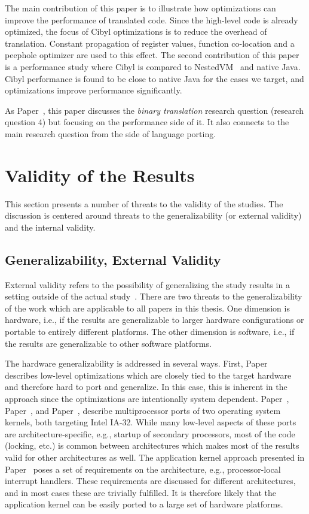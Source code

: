 The main contribution of this paper is to illustrate how optimizations can
improve the performance of translated code. Since the high-level code is
already optimized, the focus of Cibyl optimizations is to reduce the overhead
of translation. Constant propagation of register values, function co-location
and a peephole optimizer are used to this effect. The second contribution of
this paper is a performance study where Cibyl is compared to
NestedVM~\cite{alliet04nestedvm} and native Java. Cibyl performance is found
to be close to native Java for the cases we target, and optimizations improve
performance significantly.

As Paper~, this paper discusses the \emph{binary translation}
research question (research question 4) but focusing on the performance side
of it. It also connects to the main research question from the side of
language porting.

\section{Validity of the Results}
\label{sec:intro:validity}
This section presents a number of threats to the validity of the studies. The
discussion is centered around threats to the generalizability (or external
validity) and the internal validity.

\subsection{Generalizability, External Validity}
External validity refers to the possibility of generalizing the study results
in a setting outside of the actual study~\cite[page 106]{robson02realworld}.
There are two threats to the generalizability of the work which are
applicable to all papers in this thesis. One dimension is hardware, i.e., if
the results are generalizable to larger hardware configurations or portable to
entirely different platforms. The other dimension is software, i.e., if the
results are generalizable to other software platforms.

The hardware generalizability is addressed in several ways. First,
Paper~ describes low-level optimizations which are closely tied
to the target hardware and therefore hard to port and generalize. In this
case, this is inherent in the approach since the optimizations are
intentionally system dependent. Paper~,
Paper~, and Paper~, describe
multiprocessor ports of two operating system kernels, both targeting Intel
IA-32.  While many low-level aspects of these ports are architecture-specific,
e.g., startup of secondary processors, most of the code (locking, etc.) is
common between architectures which makes most of the results valid for other
architectures as well. The application kernel approach presented in
Paper~ poses a set of requirements on the
architecture, e.g., processor-local interrupt handlers. These requirements are
discussed for different architectures, and in most cases these are trivially
fulfilled. It is therefore likely that the application kernel can be easily
ported to a large set of hardware platforms.

